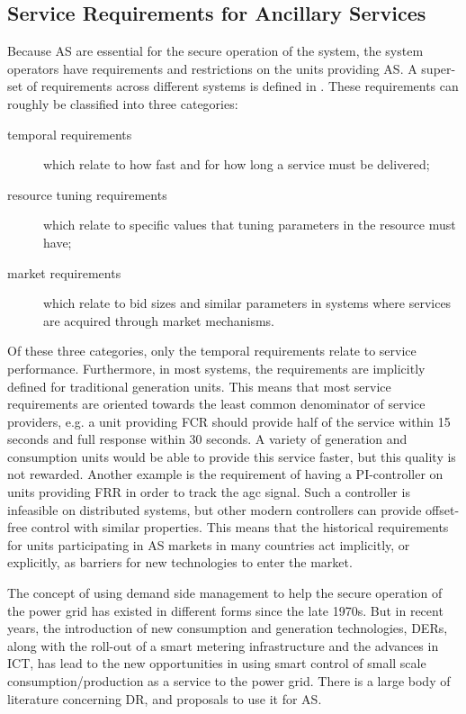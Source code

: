 \subsection{Service Requirements for Ancillary Services} %
\label{sub:servreqAS}
Because AS are essential for the secure operation of the system, the system operators have requirements and restrictions on the units providing AS. A super-set of requirements across different systems is defined in . These requirements can roughly be classified into three categories:
\begin{description}
	\item[temporal requirements] which relate to how fast and for how long a service must be delivered;
	\item[resource tuning requirements] which relate to specific values that tuning parameters in the resource must have;
	\item[market requirements] which relate to bid sizes and similar parameters in systems where services are acquired through market mechanisms.
\end{description}

Of these three categories, only the temporal requirements relate to service performance. Furthermore, in most systems, the requirements are implicitly defined for traditional generation units. This means that most service requirements are oriented towards the least common denominator of service providers, e.g. a unit providing FCR should provide half of the service within 15 seconds and full response within 30 seconds. A variety of generation and consumption units would be able to provide this service faster, but this quality is not rewarded. Another example is the requirement of having a PI-controller on units providing FRR in order to track the \gls{agc} signal. Such a controller is infeasible on distributed systems, but other modern controllers can provide offset-free control with similar properties. This means that the historical requirements for units participating in AS markets in many countries act implicitly, or explicitly, as barriers for new technologies to enter the market.

The concept of using demand side management to help the secure operation of the power grid has existed in different forms since the late 1970s. But in recent years, the introduction of new consumption and generation technologies, \ie DERs, along with the roll-out of a smart metering infrastructure and the advances in ICT, has lead to the new opportunities in using smart control of small scale consumption/production as a service to the power grid. There is a large body of literature concerning DR, and proposals to use it for AS.%
